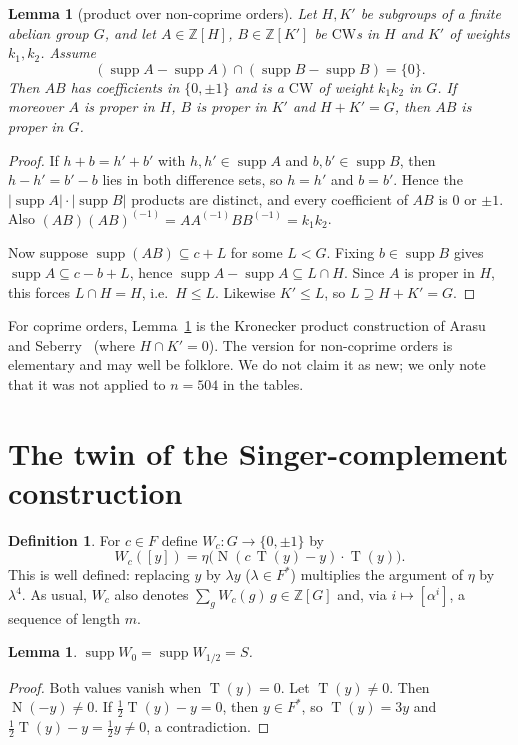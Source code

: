 \documentclass[11pt]{article}
\numberwithin{equation}{section}
\newtheorem{lemma}[theorem]{Lemma}
\theoremstyle{definition}
\newtheorem{definition}[theorem]{Definition}
\theoremstyle{remark}
\newcommand{\Z}{\mathbb Z}
\newcommand{\CW}{\mathrm{CW}}
\DeclareMathOperator{\supp}{supp}
\DeclareMathOperator{\Tr}{T}
\DeclareMathOperator{\Nm}{N}
\begin{document}
\begin{lemma}[product over non-coprime orders]\label{lem:product}
Let $H,K'$ be subgroups of a finite abelian group $G$, and let $A\in\Z[H]$, $B\in\Z[K']$ be
$\CW$s in $H$ and $K'$ of weights $k_1,k_2$. Assume
\[
(\supp A-\supp A)\cap(\supp B-\supp B)=\{0\}.
\]
Then $AB$ has coefficients in $\{0,\pm1\}$ and is a $\CW$ of weight $k_1k_2$ in $G$. If moreover
$A$ is proper in $H$, $B$ is proper in $K'$ and $H+K'=G$, then $AB$ is proper in $G$.
\end{lemma}
\begin{proof}
If $h+b=h'+b'$ with $h,h'\in\supp A$ and $b,b'\in\supp B$, then $h-h'=b'-b$ lies in both
difference sets, so $h=h'$ and $b=b'$. Hence the $|\supp A|\cdot|\supp B|$ products are
distinct, and every coefficient of $AB$ is $0$ or $\pm1$. Also
$(AB)(AB)^{(-1)}=AA^{(-1)}BB^{(-1)}=k_1k_2$.

Now suppose $\supp(AB)\subseteq c+L$ for some $L<G$. Fixing $b\in\supp B$ gives
$\supp A\subseteq c-b+L$, hence $\supp A-\supp A\subseteq L\cap H$. Since $A$ is proper in $H$,
this forces $L\cap H=H$, i.e.\ $H\le L$. Likewise $K'\le L$, so $L\supseteq H+K'=G$.
\end{proof}

For coprime orders, Lemma~\ref{lem:product} is the Kronecker product construction of Arasu and
Seberry~\cite{AS98} (where $H\cap K'=0$). The version for non-coprime orders is elementary and
may well be folklore. We do not claim it as new; we only note that it was not applied to
$n=504$ in the tables.

\section{The twin of the Singer-complement construction}\label{sec:twin}

\begin{definition}\label{def:Wc}
For $c\in F$ define $W_c\colon G\to\{0,\pm1\}$ by
\[
  W_c([y])=\eta\bigl(\Nm(c\,\Tr(y)-y)\cdot \Tr(y)\bigr).
\]
This is well defined: replacing $y$ by $\lambda y$ ($\lambda\in F^*$) multiplies the argument of
$\eta$ by $\lambda^4$. As usual, $W_c$ also denotes $\sum_{g}W_c(g)\,g\in\Z[G]$ and, via
$i\mapsto[\alpha^i]$, a sequence of length $m$.
\end{definition}

\begin{lemma}\label{lem:support}
$\supp W_0=\supp W_{1/2}=S$.
\end{lemma}
\begin{proof}
Both values vanish when $\Tr(y)=0$. Let $\Tr(y)\neq0$. Then $\Nm(-y)\neq0$. If
$\tfrac12\Tr(y)-y=0$, then $y\in F^*$, so $\Tr(y)=3y$ and $\tfrac12\Tr(y)-y=\tfrac12y\ne0$, a
contradiction.
\end{proof}
\end{document}
